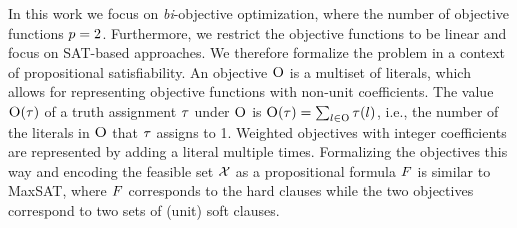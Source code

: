 In this work we focus on \emph{bi}-objective optimization, where the number of objective functions $p=2$.
Furthermore, we restrict the objective functions to be linear and focus on SAT-based approaches.
We therefore formalize the problem in a context of propositional satisfiability.
An objective $\textsc{O}$ is a multiset of literals, which allows for representing objective functions with non-unit coefficients.
The value $\textsc{O}(\tau)$ of a truth assignment $\tau$ under $\textsc{O}$ is $\textsc{O}(\tau) = \sum_{l \in \textsc{O}} \tau(l)$, i.e., the number of the literals in $\textsc{O}$ that $\tau$ assigns to 1. 
Weighted objectives with integer coefficients are represented by adding a literal multiple times.
Formalizing the objectives this way and encoding the feasible set $\mathcal{X}$ as a propositional formula $F$ is similar to MaxSAT, where $F$ corresponds to the hard clauses while the two objectives correspond to two sets of (unit) soft clauses.

